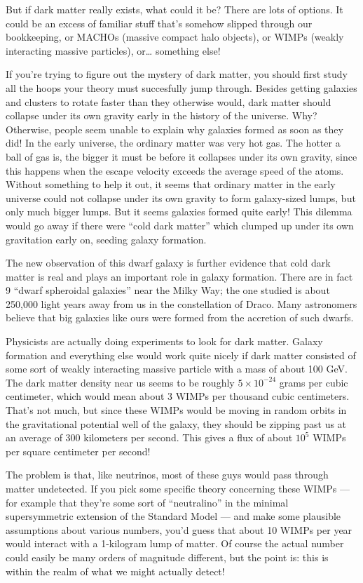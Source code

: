 \documentclass{article}
\begin{document}
But if dark matter really exists, what could it be? There are lots of
options. It could be an excess of familiar stuff that's somehow slipped
through our bookkeeping, or MACHOs (massive compact halo objects), or
WIMPs (weakly interacting massive particles), or\ldots{} something else!

If you're trying to figure out the mystery of dark matter, you should
first study all the hoops your theory must succesfully jump through.
Besides getting galaxies and clusters to rotate faster than they
otherwise would, dark matter should collapse under its own gravity early
in the history of the universe. Why? Otherwise, people seem unable to
explain why galaxies formed as soon as they did! In the early universe,
the ordinary matter was very hot gas. The hotter a ball of gas is, the
bigger it must be before it collapses under its own gravity, since this
happens when the escape velocity exceeds the average speed of the atoms.
Without something to help it out, it seems that ordinary matter in the
early universe could not collapse under its own gravity to form
galaxy-sized lumps, but only much bigger lumps. But it seems galaxies
formed quite early! This dilemma would go away if there were ``cold dark
matter'' which clumped up under its own gravitation early on, seeding
galaxy formation.

The new observation of this dwarf galaxy is further evidence that cold
dark matter is real and plays an important role in galaxy formation.
There are in fact 9 ``dwarf spheroidal galaxies'' near the Milky Way;
the one studied is about 250,000 light years away from us in the
constellation of Draco. Many astronomers believe that big galaxies like
ours were formed from the accretion of such dwarfs.

Physicists are actually doing experiments to look for dark matter.
Galaxy formation and everything else would work quite nicely if dark
matter consisted of some sort of weakly interacting massive particle
with a mass of about 100 GeV. The dark matter density near us seems to
be roughly \(5\times 10^{-24}\) grams per cubic centimeter, which would
mean about 3 WIMPs per thousand cubic centimeters. That's not much, but
since these WIMPs would be moving in random orbits in the gravitational
potential well of the galaxy, they should be zipping past us at an
average of 300 kilometers per second. This gives a flux of about
\(10^5\) WIMPs per square centimeter per second!

The problem is that, like neutrinos, most of these guys would pass
through matter undetected. If you pick some specific theory concerning
these WIMPs --- for example that they're some sort of ``neutralino'' in
the minimal supersymmetric extension of the Standard Model --- and make
some plausible assumptions about various numbers, you'd guess that about
10 WIMPs per year would interact with a 1-kilogram lump of matter. Of
course the actual number could easily be many orders of magnitude
different, but the point is: this is within the realm of what we might
actually detect!
\end{document}
